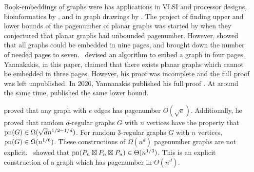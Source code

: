 Book-embeddings of graphs were has applications in VLSI and processor designs, bioinformatics by \textcite{haslingerRNAStructuresPseudoknots1999}, and in graph drawings by \textcite{woodBoundedDegreeBook2002}. 
The project of finding upper and lower bounds of the pagenumber of planar graphs was started by \textcite{bernhartBookThicknessGraph1979} when they conjectured that planar graphs had unbounded pagenumber. However, \textcite{bussPagenumberPlanarGraphs1984} showed that all graphs could be embedded in nine pages, and \textcite{heathEmbeddingPlanarGraphs1984} brought down the number of needed pages to seven.\ \textcite{yannakakisEmbeddingPlanarGraphs1989} devised an algorithm to embed a graph in four pages. Yannakakis, in this paper, claimed that there exists planar graphs which cannot be embedded in three pages. However, his proof was incomplete and the full proof was left unpublished. In 2020, Yannanakis published his full proof \cite{yannakakisPlanarGraphsThat2020}. At around the same time, \textcite{kaufmannFourPagesAre2020} published the same lower bound.

\textcite{malitzGraphsEdgesHave1994} proved that any graph with $e$ edges has pagenumber $O(\sqrt{e})$. Additionally, he proved that random $d$-regular graphs $G$ with $n$ vertices have the property that $\operatorname{pn}(G) \in \Omega(\sqrt{d} n^{1/2 - 1/d})$. For random 3-regular graphs $G$ with $n$ vertices, $\operatorname{pn}(G) \in \Omega(n^{1/6})$. These constructions of $\Omega(n^d)$ pagenumber graphs are not explicit.\ \textcite{eppsteinThreeDimensionalGraphProducts2024} showed that $\operatorname{pn}(P_n \boxtimes P_n \boxtimes P_n) \in \Theta(n^{1/3})$. This is an explicit construction of a graph which has pagenumber in $\Theta(n^{d})$. 